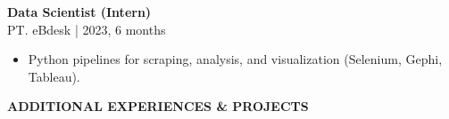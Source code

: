\documentclass[11pt,a4paper]{article}
\newcommand{\jobentry}[2]{%
    \textbf{#1}\\
    {\small\color{lighttext}#2}\\[4pt]%
}
\begin{document}
\begin{minipage}[t]{14cm}
\begin{minipage}[t]{12.5cm}
\vspace{0.3cm}

\jobentry{Data Scientist (Intern)}{PT. eBdesk | 2023, 6 months}
\begin{itemize}[leftmargin=*, nosep, itemsep=2pt, topsep=2pt]
    \item Python pipelines for scraping, analysis, and visualization (Selenium, Gephi, Tableau).
\end{itemize}

\end{minipage}
\end{minipage}

\newpage


\vspace{1.2cm}

\begin{center}
{\large\bfseries\MakeUppercase{Additional Experiences \& Projects}}
\end{center}

\vspace{0.5cm}
\end{document}
